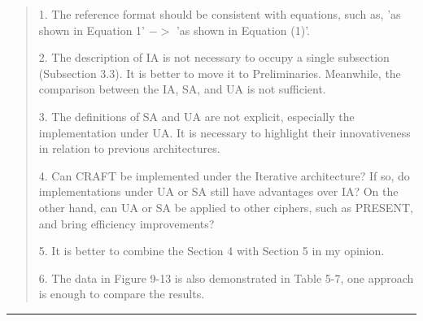 \begin{quote}
	1. The reference format should be consistent with equations, such as, 'as shown in Equation 1' $->$ 'as shown in Equation (1)'.

	2. The description of IA is not necessary to occupy a single subsection (Subsection 3.3). It is better to move it to Preliminaries. Meanwhile, the comparison between the IA, SA, and UA is not sufficient.

	3. The definitions of SA and UA are not explicit, especially the implementation under UA. It is necessary to highlight their innovativeness in relation to previous architectures.

	4. Can CRAFT be implemented under the Iterative architecture? If so, do implementations under UA or SA still have advantages over IA? On the other hand, can UA or SA be applied to other ciphers, such as PRESENT, and bring efficiency improvements?

	5. It is better to combine the Section 4 with Section 5 in my opinion.

	6. The data in Figure 9-13 is also demonstrated in Table 5-7, one approach is enough to compare the results.

\end{quote}

\noindent\rule{\linewidth}{6.0pt}